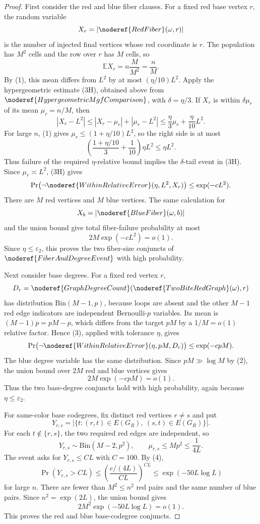 \begin{proof}
First consider the red and blue fiber clauses.  For a fixed red base vertex
\(r\), the random variable
\[
X_r=|\noderef{RedFiber}(\omega,r)|
\]
is the number of injected final vertices whose red coordinate is \(r\).
The population has \(M^2\) cells and the row over \(r\) has \(M\) cells, so
\[
\mathbb E X_r=n\frac{M}{M^2}=\frac nM.
\]
By (1), this mean differs from \(L^2\) by at most
\((\eta/10)L^2\).  Apply the hypergeometric estimate (3H), obtained above
from \(\noderef{HypergeometricMgfComparison}\), with \(\delta=\eta/3\).
If \(X_r\) is within \(\delta\mu_r\) of its mean
\(\mu_r=n/M\), then
\[
|X_r-L^2|\le |X_r-\mu_r|+|\mu_r-L^2|
\le \frac{\eta}{3}\mu_r+\frac{\eta}{10}L^2.
\]
For large \(n\), (1) gives \(\mu_r\le(1+\eta/10)L^2\), so the right side is
at most
\[
\left(\frac{1+\eta/10}{3}+\frac1{10}\right)\eta L^2
\le \eta L^2.
\]
Thus failure of the required \(\eta\)-relative bound implies the
\(\delta\)-tail event in (3H).  Since \(\mu_r\asymp L^2\), (3H) gives
\[
\Pr\bigl(\neg\noderef{WithinRelativeError}
(\eta,L^2,X_r)\bigr)\le \exp(-cL^2).
\]
There are \(M\) red vertices and \(M\) blue vertices.  The same calculation
for
\[
X_b=|\noderef{BlueFiber}(\omega,b)|
\]
and the union bound give total fiber-failure probability at most
\[
2M\exp(-cL^2)=o(1).
\tag{5}
\]
Since \(\eta\le\varepsilon_2\), this proves the two fiber-size conjuncts of
\(\noderef{FiberAndDegreeEvent}\) with high probability.

Next consider base degrees.  For a fixed red vertex \(r\),
\[
D_r=\noderef{GraphDegreeCount}(\noderef{TwoBiteRedGraph}(\omega),r)
\]
has distribution \(\mathrm{Bin}(M-1,p)\), because loops are absent and the
other \(M-1\) red edge indicators are independent Bernoulli-\(p\) variables.
Its mean is \((M-1)p=pM-p\), which differs from the target \(pM\) by a
\(1/M=o(1)\) relative factor.  Hence (3), applied with tolerance \(\eta\),
gives
\[
\Pr\bigl(\neg\noderef{WithinRelativeError}(\eta,pM,D_r)\bigr)
\le \exp(-c pM).
\]
The blue degree variable has the same distribution.  Since
\(pM\gg \log M\) by (2), the union bound over \(2M\) red and blue vertices
gives
\[
2M\exp(-c pM)=o(1).
\tag{6}
\]
Thus the two base-degree conjuncts hold with high probability, again because
\(\eta\le\varepsilon_2\).

For same-color base codegrees, fix distinct red vertices \(r\ne s\) and put
\[
Y_{r,s}=\left|\{t:(r,t)\in E(G_R),\ (s,t)\in E(G_R)\}\right|.
\]
For each \(t\notin\{r,s\}\), the two required red edges are independent, so
\[
Y_{r,s}\sim \mathrm{Bin}(M-2,p^2),\qquad
\mu_{r,s}\le Mp^2\le \frac1{4L}.
\]
The event asks for \(Y_{r,s}\le C L\) with \(C=100\).  By (4),
\[
\Pr(Y_{r,s}>CL)
\le \left(\frac{e/(4L)}{CL}\right)^{CL}
\le \exp(-50L\log L)
\]
for large \(n\).  There are fewer than \(M^2\le n^2\) red pairs and the same
number of blue pairs.  Since \(n^2=\exp(2L)\), the union bound gives
\[
2M^2\exp(-50L\log L)=o(1).
\tag{7}
\]
This proves the red and blue base-codegree conjuncts.


\end{proof}
